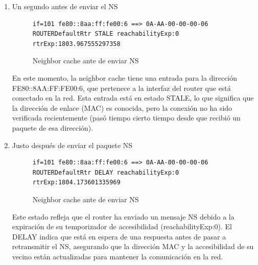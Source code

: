 \begin{enumerate}
    \item Un segundo antes de enviar el NS
    
    \begin{figure}[H]
        \centering
        \begin{lstlisting}
if=101 fe80::8aa:ff:fe00:6 ==> 0A-AA-00-00-00-06 ROUTERDefaultRtr STALE reachabilityExp:0 rtrExp:1803.967555297358
        \end{lstlisting}
        \caption{Neighbor cache ante de enviar NS}
        \label{fig:cache_antes_ns}
    \end{figure}

    En este momento, la neighbor cache tiene una entrada para la dirección FE80::8AA:FF:FE00:6, que pertenece a la interfaz del router que está conectado en la red. Esta entrada está en estado STALE, lo que significa que la dirección de enlace (MAC) es conocida, pero la conexión no ha sido verificada recientemente (pasó tiempo cierto tiempo desde que recibió un paquete de esa dirección).

    \item Justo después de enviar el paquete NS
    
 


  \begin{figure}[H]
    \centering
    \begin{lstlisting}
if=101 fe80::8aa:ff:fe00:6 ==> 0A-AA-00-00-00-06 ROUTERDefaultRtr DELAY reachabilityExp:0 rtrExp:1804.173601335969    
    \end{lstlisting}
    \caption{Neighbor cache ante de enviar NS}
    \label{fig:cache_antes_ns}
\end{figure}

   Este estado refleja que el router ha enviado un mensaje NS debido a la expiración de su temporizador de accesibilidad (reachabilityExp:0). El DELAY indica que está en espera de una respuesta antes de pasar a retransmitir el NS, asegurando que la dirección MAC y la accesibilidad de su vecino están actualizadas para mantener la comunicación en la red.


\end{enumerate}
